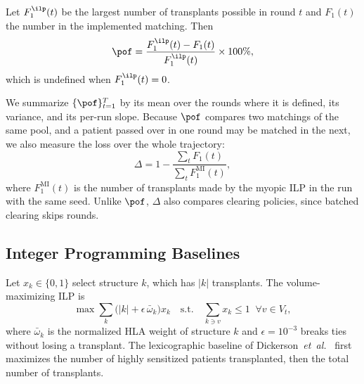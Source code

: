 \documentclass[journal]{IEEEtran}
\begin{document}
\begin{definition}
Let $F_1^{\ilp}(t)$ be the largest number of transplants possible in
round $t$ and $F_1(t)$ the number in the implemented matching. Then
\begin{equation}
  \pof = \frac{F_1^{\ilp}(t) - F_1(t)}{F_1^{\ilp}(t)} \times 100\% ,
  \label{eq:pof}
\end{equation}
which is undefined when $F_1^{\ilp}(t) = 0$.
\end{definition}

We summarize $\{\pof\}_{t=1}^{T}$ by its mean over the rounds where it
is defined, its variance, and its per-run slope. Because $\pof$
compares two matchings of the same pool, and a patient passed over in
one round may be matched in the next, we also measure the loss over the
whole trajectory:
\begin{equation}
  \Delta = 1 - \frac{\sum_t F_1(t)}{\sum_t F_1^{\mathrm{MI}}(t)} ,
  \label{eq:delta}
\end{equation}
where $F_1^{\mathrm{MI}}(t)$ is the number of transplants made by the
myopic ILP in the run with the same seed. Unlike $\pof$, $\Delta$ also
compares clearing policies, since batched clearing skips rounds.

\subsection{Integer Programming Baselines}
\label{sec:problem:ilp}

Let $x_k \in \{0,1\}$ select structure $k$, which has $|k|$
transplants. The volume-maximizing ILP is
\begin{equation}
  \max \sum_k \bigl(|k| + \epsilon\, \bar\omega_k\bigr) x_k
  \quad \text{s.t.} \quad
  \sum_{k \ni v} x_k \leq 1 \;\; \forall v \in V_t ,
  \label{eq:ilp}
\end{equation}
where $\bar\omega_k$ is the normalized HLA weight of structure $k$ and
$\epsilon = 10^{-3}$ breaks ties without losing a transplant. The
lexicographic baseline of
Dickerson~\textit{et~al.}~\cite{dickerson2014price} first maximizes the
number of highly sensitized patients transplanted, then the total
number of transplants.
\end{document}
